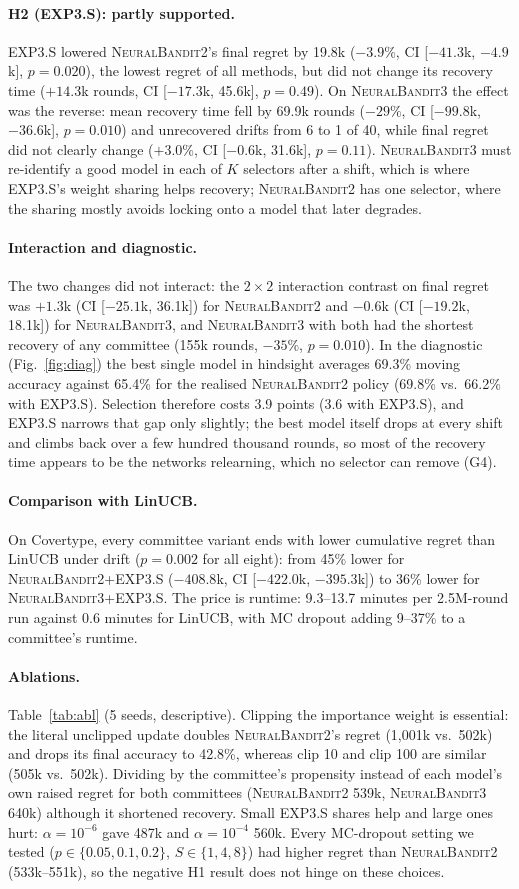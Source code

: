 \documentclass[sigconf]{acmart}
\newcommand{\NB}{\textsc{NeuralBandit}}
\begin{document}
\paragraph{H2 (EXP3.S): partly supported.} EXP3.S lowered \NB{}2's final regret by 19.8k ($-3.9\%$, CI [$-41.3$k,
$-4.9$k], $p=0.020$), the lowest regret of all methods, but did not change its recovery time ($+14.3$k rounds, CI
[$-17.3$k, 45.6k], $p=0.49$). On \NB{}3 the effect was the reverse: mean recovery time fell by 69.9k rounds
($-29\%$, CI [$-99.8$k, $-36.6$k], $p=0.010$) and unrecovered drifts from 6 to 1 of 40, while final regret did not
clearly change ($+3.0\%$, CI [$-0.6$k, 31.6k], $p=0.11$). \NB{}3 must re-identify a good model in each of $K$
selectors after a shift, which is where EXP3.S's weight sharing helps recovery; \NB{}2 has one selector, where the
sharing mostly avoids locking onto a model that later degrades.
\paragraph{Interaction and diagnostic.} The two changes did not interact: the $2\times2$ interaction contrast on
final regret was $+1.3$k (CI [$-25.1$k, 36.1k]) for \NB{}2 and $-0.6$k (CI [$-19.2$k, 18.1k]) for \NB{}3, and
\NB{}3 with both had the shortest recovery of any committee (155k rounds, $-35\%$, $p=0.010$). In the diagnostic
(Fig.~\ref{fig:diag}) the best single model in hindsight averages 69.3\% moving accuracy against 65.4\% for the
realised \NB{}2 policy (69.8\% vs.\ 66.2\% with EXP3.S). Selection therefore costs 3.9 points (3.6 with EXP3.S), and EXP3.S
narrows that gap only slightly; the best model itself drops at every shift and climbs back over a few hundred
thousand rounds, so most of the recovery time appears to be the networks relearning, which no selector can remove (G4).
\paragraph{Comparison with LinUCB\@.} On Covertype, every committee variant ends with lower cumulative regret than
LinUCB under drift ($p=0.002$ for all eight): from 45\% lower for \NB{}2+EXP3.S ($-408.8$k, CI [$-422.0$k, $-395.3$k]) to 36\%
lower for \NB{}3+EXP3.S. The price is runtime: 9.3--13.7 minutes per 2.5M-round run against 0.6 minutes for LinUCB, with MC
dropout adding 9--37\% to a committee's runtime.
\paragraph{Ablations.} Table~\ref{tab:abl} (5 seeds, descriptive). Clipping the importance weight is essential:
the literal unclipped update doubles \NB{}2's regret (1{,}001k vs.\ 502k) and drops its final accuracy to 42.8\%,
whereas clip 10 and clip 100 are similar (505k vs.\ 502k). Dividing by the committee's propensity instead of each
model's own raised regret for both committees (\NB{}2 539k, \NB{}3 640k) although it shortened recovery. Small
EXP3.S shares help and large ones hurt: $\alpha=10^{-6}$ gave 487k and $\alpha=10^{-4}$ 560k. Every MC-dropout
setting we tested ($p\in\{0.05,0.1,0.2\}$, $S\in\{1,4,8\}$) had higher regret than \NB{}2 (533k--551k), so the
negative H1 result does not hinge on these choices.
\end{document}
